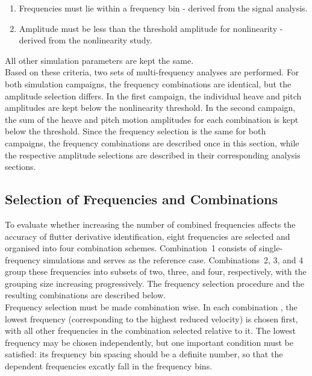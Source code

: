 \documentclass[a4paper, 12pt]{report}
\begin{document}
\begin{enumerate}
    \item Frequencies must lie within a frequency bin - derived from the signal analysis.
    \item Amplitude must be less than the threshold amplitude for nonlinearity - derived from the nonlinearity study.
\end{enumerate}

All other simulation parameters are kept the same.\\

Based on these criteria, two sets of multi-frequency analyses are performed. For both simulation 
campaigns, the frequency combinations are identical, but the amplitude selection differs. 
In the first campaign, the individual heave and pitch amplitudes are kept below the nonlinearity 
threshold. In the second campaign, the sum of the heave and pitch motion amplitudes for each 
combination is kept below the threshold. Since the frequency selection is the same for 
both campaigns, the frequency combinations are described once in this section, while the 
respective amplitude selections are described in their corresponding analysis sections.

\subsection*{Selection of Frequencies and Combinations}

To evaluate whether increasing the number of combined frequencies affects 
the accuracy of flutter derivative identification, eight frequencies are selected and 
organised into four combination schemes. Combination~1 consists of single-frequency 
simulations and serves as the reference case. Combinations~2, 3, and 4 group these 
frequencies into subsets of two, three, and four, respectively, with the grouping size 
increasing progressively. The frequency selection procedure and the resulting combinations 
are described below. \\

Frequency selection must be made combination wise. In each combination
, the lowest frequency (corresponding to the highest reduced velocity) is 
chosen first, with all other frequencies in the combination selected relative to it. The lowest frequency may be 
chosen independently, but one important condition must be satisfied: its frequency bin spacing 
should be a definite number, so that the dependent frequencies excatly fall in the frequency bins.\\
\end{document}
